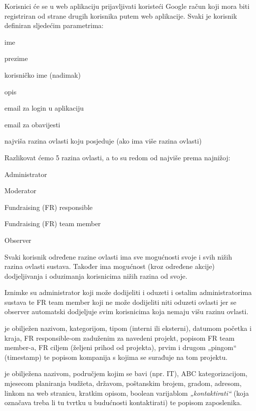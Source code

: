 		{Korisnici će se u web aplikaciju prijavljivati koristeći Google račun koji mora biti registriran od strane drugih korisnika putem web aplikacije. Svaki je korisnik definiran sljedećim parametrima:}
		\begin{packed_item}
			\item {ime}
			\item {prezime}
			\item {korisničko ime} (nadimak)
			\item {opis}
			\item {email za login u aplikaciju}
			\item {email za obavijesti}
			\item {najviša razina ovlasti koju posjeduje (ako ima više razina ovlasti)}
		\end{packed_item}
		
		{Razlikovat ćemo 5 razina ovlasti, a to su redom od najviše prema najnižoj:}
		\begin{packed_item}
			\item {Administrator}
			\item {Moderator}
			\item {Fundraising (FR) responsible}
			\item {Fundraising (FR) team member}
			\item {Observer}
		\end{packed_item}

		{Svaki korisnik određene razine ovlasti ima sve mogućnosti svoje i svih nižih razina ovlasti sustava. Također ima mogućnost (kroz određene akcije) dodjeljivanja i oduzimanja  korisnicima nižih razina od svoje.}

		{Iznimke su administrator koji može dodijeliti i oduzeti i ostalim administratorima sustava te FR team member koji ne može dodijeliti niti oduzeti ovlasti jer se observer automatski dodjeljuje svim korisnicima koja nemaju višu razinu ovlasti.}\vspace{0.3cm}
		
		{ je obilježen nazivom, kategorijom, tipom (interni ili eksterni), datumom početka i kraja, FR responsible-om zaduženim za navedeni projekt, popisom FR team member-a, FR ciljem (željeni prihod od projekta), prvim i drugom „pingom“ (timestamp) te popisom kompanija s kojima se surađuje na tom projektu.}\vspace{0.1cm}

		{ je obilježena nazivom, područjem kojim se bavi (npr. IT), ABC kategorizacijom, mjesecom planiranja budžeta, državom, poštanskim brojem, gradom, adresom, linkom na web stranicu, kratkim opisom, boolean varijablom \textit{„kontaktirati“} (koja označava treba li tu tvrtku u budućnosti kontaktirati) te popisom zaposlenika.}\vspace{0.1cm}
		
